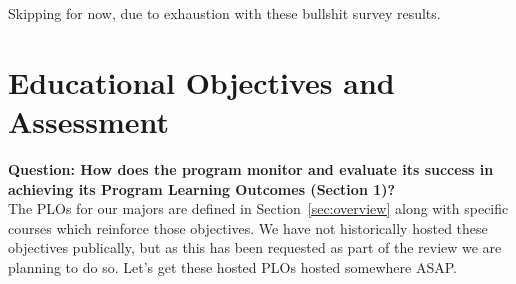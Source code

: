 \documentclass[12pt]{article}
\begin{document}
Skipping for now, due to exhaustion with these bullshit survey results.

\newpage
\section{Educational Objectives and Assessment}

{\bf Question: How does the program monitor and evaluate its success in achieving its Program  Learning Outcomes (Section 1)?}\\[3pt]



\noindent
The PLOs for our majors are defined in Section~\ref{sec:overview}
along with specific courses which reinforce those objectives.  We have
not historically hosted these objectives publically, but as this has
been requested as part of the review we are planning to do
so. {\color{red} Let's get these hosted PLOs hosted somewhere ASAP.}
\end{document}
